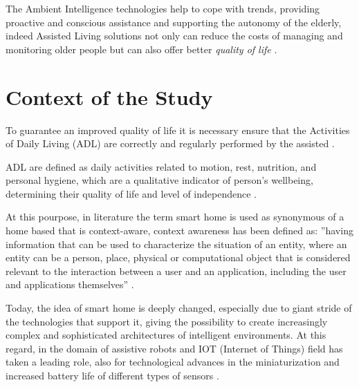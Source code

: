 \documentclass{thesisreport}
\begin{document}
 \parskip  \parskip
 
 The Ambient Intelligence technologies help to cope with trends, providing proactive and conscious assistance and supporting the autonomy of the elderly, indeed Assisted Living solutions not only can reduce the costs of managing and monitoring older people but can also offer better \textit{quality of life} \cite{kleinberger2007ambient}.
 
 
 \section{Context of the Study}
  To guarantee an improved quality of life it is necessary ensure that the Activities of Daily Living (ADL) are correctly and regularly performed by the assisted \cite{buoncompagni2017towards}.
 
 ADL are defined as daily activities related to motion, rest, nutrition, and personal hygiene, which are a qualitative indicator of person’s wellbeing, determining their quality of life and level of independence \cite{buoncompagni2017towards}. 
 
 At this pourpose, in literature the term smart home is used as synonymous of a home based that is context-aware, context awareness has been defined as: ”having information that can be used to characterize the situation of an entity, where an entity can be a person, place, physical or computational object that is considered relevant to the interaction between a user and an application, including the user and applications themselves” \cite{abowd1999towards}. 

 Today, the idea of smart home is deeply changed, especially due to giant stride of the technologies that support it, giving the possibility to create increasingly complex and sophisticated architectures of intelligent environments. At this regard, in the domain of assistive robots and IOT (Internet of Things) field has taken a leading role, also for technological advances in the miniaturization and increased battery life of different types of sensors \cite{phdthesis} \cite{nakashima2009handbook}.
 
\end{document}
